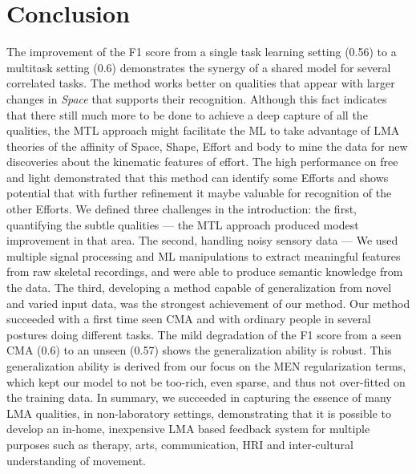 \documentclass{sigchi}
\begin{document}
\section{Conclusion}

The improvement of the F1 score from a single task learning setting (0.56) to a multitask setting (0.6) demonstrates the synergy of a shared model for several correlated tasks. 
The method works better on qualities that appear with larger changes in \textit{Space} that supports their recognition. 
Although this fact indicates that there still much more to be done to achieve a
deep capture of all the qualities, the MTL approach might facilitate the ML to
take advantage of LMA theories of the affinity of Space, Shape, Effort and body
to mine the data for new discoveries about the kinematic features of effort.
The high performance on free and light demonstrated that this method can identify some Efforts and shows potential that with further refinement it maybe valuable for recognition of the other Efforts. 
We defined  three challenges in the introduction: the first, quantifying the subtle qualities --- 
the MTL approach produced modest improvement in that area.
The second, handling noisy sensory data --- We used multiple signal processing and ML manipulations to extract meaningful features from raw skeletal recordings, and were able to produce semantic knowledge from the data. 
The third, developing a method capable  of generalization from novel and varied input data, was the strongest achievement of our method. Our method succeeded with a first time seen CMA and with ordinary people in several postures doing different tasks. 
The mild degradation of the F1 score from a seen CMA (0.6) to an unseen (0.57) shows the generalization ability is robust.
This generalization ability is derived from our focus on the MEN regularization terms, which kept our model to not be too-rich, even sparse, and thus not over-fitted on the training data.
In summary, we succeeded in capturing the essence of many LMA qualities, in non-laboratory settings, demonstrating that it is possible to develop an in-home, inexpensive LMA based feedback system for multiple purposes such as therapy, arts, communication, HRI and inter-cultural understanding of movement.


\end{document}
